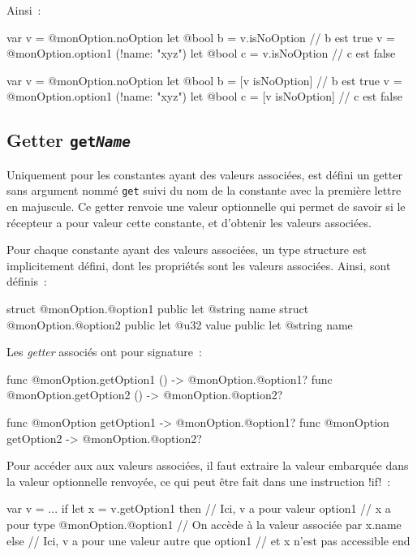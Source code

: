 Ainsi~:

\begin{galgas4}
var v = @monOption.noOption
let @bool b = v.isNoOption // b est true
v = @monOption.option1 (!name: "xyz")
let @bool c = v.isNoOption // c est false
\end{galgas4}
\begin{galgas4}
var v = @monOption.noOption
let @bool b = [v isNoOption] // b est true
v = @monOption.option1 (!name: "xyz")
let @bool c = [v isNoOption] // c est false
\end{galgas4}



\subsection{Getter \texttt{get\emph{Name}}}

Uniquement pour les constantes ayant des valeurs associées, est défini un getter sans argument nommé \texttt{get} suivi du nom  de la constante avec la première lettre en majuscule. Ce getter renvoie une valeur optionnelle qui permet de savoir si le récepteur a pour valeur cette constante, et d'obtenir les valeurs associées.

Pour chaque constante ayant des valeurs associées, un type structure est implicitement défini, dont les propriétés sont les valeurs associées. Ainsi, sont définis~:
\begin{galgas4}
struct @monOption.@option1 {
  public let @string name
}
struct @monOption.@option2 {
  public let @u32 value
  public let @string name
}
\end{galgas4}

Les \emph{getter} associés ont pour signature~:
\begin{galgas4}
func @monOption.getOption1 () -> @monOption.@option1?
func @monOption.getOption2 () -> @monOption.@option2?
\end{galgas4}
\begin{galgas4}
func @monOption getOption1 -> @monOption.@option1?
func @monOption getOption2 -> @monOption.@option2?
\end{galgas4}

Pour accéder aux aux valeurs associées, il faut extraire la valeur embarquée dans la valeur optionnelle renvoyée, ce qui peut être fait dans une instruction \ggsq!if!~:

\begin{galgas4}
var v = ...
if let x = v.getOption1 then
  // Ici, v a pour valeur option1
  // x a pour type @monOption.@option1
  // On accède à la valeur associée par x.name
else
  // Ici, v a pour une valeur autre que option1
  // et x n'est pas accessible
end
\end{galgas4}

